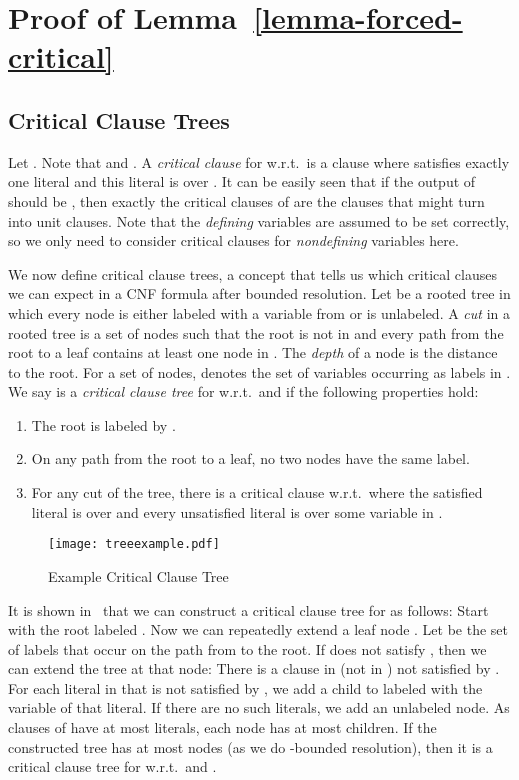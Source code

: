 \section{Proof of Lemma~\ref{lemma-forced-critical}}
\label{section-prooflemma8}
\subsection{Critical Clause Trees}
 Let
. Note that  and
.
A \emph{critical clause} for  w.r.t.\   is a clause where  satisfies exactly one literal and this literal is over . It can be easily seen that if the output of  should be , then exactly the critical clauses of  are the clauses that might turn into unit clauses. Note that the \emph{defining} variables are assumed to be set correctly, so we only need to consider critical clauses for \emph{nondefining} variables here.

We now define critical clause trees, a concept that tells us which critical clauses we can expect in a CNF formula after bounded resolution. Let  be a rooted tree in which every node is either labeled with a variable from  or is unlabeled. A \emph{cut} in a rooted tree is a set of nodes  such that the root is not in  and every path from the root to a leaf contains at least one node in . The \emph{depth} of a node is the distance to the root.  
For a set  of nodes,  denotes the set of variables occurring as labels in .
We say  is a \emph{critical clause tree} for  w.r.t.\  and  if the following properties hold:

\begin{enumerate}
\item The root is labeled by .
\item On any path from the root to a leaf, no two nodes have the same label.
\item For any cut  of the tree, there is a critical clause  w.r.t.\  where the satisfied literal is over  and every unsatisfied literal is over some variable in .
\end{enumerate}

\begin{wrapfigure}{r}{4cm}
\texttt{[image: treeexample.pdf]}
\caption{Example Critical Clause Tree}
\label{f.treeexample}
\end{wrapfigure}

It is shown in~\cite{ppsz} that we can construct a critical clause tree for  as follows: Start with the root labeled . Now we can repeatedly extend a leaf node . Let  be the set of labels that occur on the path from  to the root. If  does not satisfy , then we can extend the tree at that node: There is a clause  in  (not in ) not satisfied by . For each literal in  that is not satisfied by , we add a child to  labeled with the variable of that literal. If there are no such literals, we add an unlabeled node. As clauses of  have at most  literals, each node has at most  children. If the constructed tree has at most  nodes (as we do -bounded resolution), then it is a critical clause tree for  w.r.t.\  and .

